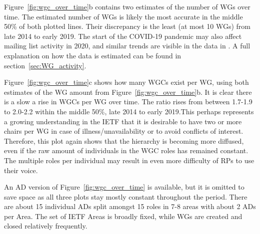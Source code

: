 \documentclass[twocolumn,10pt]{article}
\begin{document}
Figure~\ref{fig:wgc_over_time}b contains two estimates of the number of WGs
over time. The estimated number of WGs is likely the most accurate in the
middle 50\% of both plotted lines. Their discrepancy is the least (at most
10 WGs) from late 2014 to early 2019. The start of the COVID-19 pandemic
may also affect mailing list activity in 2020, and similar trends are
visible in the data in \cite{mcquistin2021characterising}. A full
explanation on how the data is estimated can be found in
section~\ref{sec:WG_activity}.

Figure~\ref{fig:wgc_over_time}c shows how many WGCs exist per WG, using
both estimates of the WG amount from Figure~\ref{fig:wgc_over_time}b. It is
clear there is a slow a rise in WGCs per WG over time. The ratio rises from
between 1.7-1.9 to 2.0-2.2 within the middle 50\%, late 2014 to early
2019.This perhaps represents a growing understanding in the IETF that it is
desirable to have two or more chairs per WG in case of
illness/unavailability or to avoid conflicts of interest. Therefore, this
plot again shows that the hierarchy is becoming more diffused, even if the
raw amount of individuals in the WGC roles has remained constant. The
multiple roles per individual may result in even more difficulty of RPs to
use their voice.

An AD version of Figure~\ref{fig:wgc_over_time} is available, but it is
omitted to save space as all three plots stay mostly constant throughout
the period. There are about 15 individual ADs split amongst 15 roles in 7-8
areas with about 2 ADs per Area. The set of IETF Areas is broadly fixed,
while WGs are created and closed relatively frequently.
\end{document}
